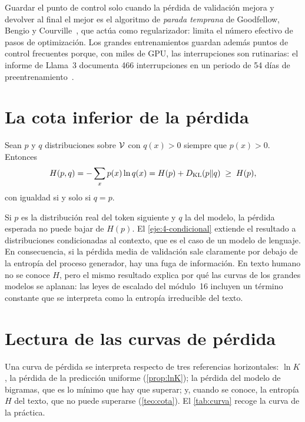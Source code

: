 \begin{observacion}\label{obs:parada}
Guardar el punto de control solo cuando la pérdida de validación mejora y devolver al final el mejor es el algoritmo de \emph{parada temprana} de Goodfellow, Bengio y Courville~\cite[§7.8]{gbc}, que actúa como regularizador: limita el número efectivo de pasos de optimización. Los grandes entrenamientos guardan además puntos de control frecuentes porque, con miles de GPU, las interrupciones son rutinarias: el informe de Llama~3 documenta 466 interrupciones en un periodo de 54 días de preentrenamiento~\cite[§3.3.4]{llama3}.
\end{observacion}

\section{La cota inferior de la pérdida}

\begin{teorema}\label{teo:cota}
Sean $p$ y $q$ distribuciones sobre $\mathcal{V}$ con $q(x)>0$ siempre que $p(x)>0$. Entonces
\[
H(p,q)=-\sum_{x}p(x)\ln q(x)=H(p)+D_{\mathrm{KL}}(p\Vert q)\;\ge\;H(p),
\]
con igualdad si y solo si $q=p$.
\end{teorema}

Si $p$ es la distribución real del token siguiente y $q$ la del modelo, la pérdida esperada no puede bajar de $H(p)$. El \cref{eje:4-condicional} extiende el resultado a distribuciones condicionadas al contexto, que es el caso de un modelo de lenguaje. En consecuencia, si la pérdida media de validación sale claramente por debajo de la entropía del proceso generador, hay una fuga de información. En texto humano no se conoce $H$, pero el mismo resultado explica por qué las curvas de los grandes modelos se aplanan: las leyes de escalado del módulo~16 incluyen un término constante que se interpreta como la entropía irreducible del texto.

\addtocounter{definicion}{1}%

\section{Lectura de las curvas de pérdida}

Una curva de pérdida se interpreta respecto de tres referencias horizontales: $\ln K$, la pérdida de la predicción uniforme (\cref{prop:lnK}); la pérdida del modelo de bigramas, que es lo mínimo que hay que superar; y, cuando se conoce, la entropía $H$ del texto, que no puede superarse (\cref{teo:cota}). El \cref{tab:curva} recoge la curva de la práctica.

